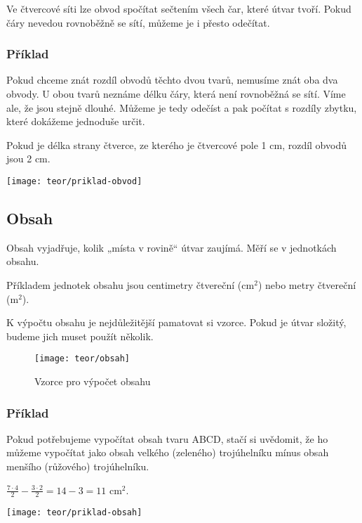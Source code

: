 Ve čtvercové síti lze obvod spočítat sečtením všech čar, které útvar tvoří. Pokud čáry nevedou rovnoběžně se sítí, můžeme je i přesto odečítat.

\subsubsection{Příklad}
\noindent
\begin{minipage}{\linewidth}
    Pokud chceme znát rozdíl obvodů těchto dvou tvarů, nemusíme znát oba dva obvody. U obou tvarů neznáme délku čáry, která není rovnoběžná se sítí. Víme ale, že jsou stejně dlouhé. Můžeme je tedy odečíst a pak počítat s rozdíly zbytku, které dokážeme jednoduše určit.

    Pokud je délka strany čtverce, ze kterého je čtvercové pole 1 cm, rozdíl obvodů jsou 2 cm.
    \begin{center}
        \texttt{[image: teor/priklad-obvod]}
    \end{center}
\end{minipage}

\subsection{Obsah}
Obsah vyjadřuje, kolik „místa v rovině“ útvar zaujímá. Měří se v jednotkách obsahu.~\cite{umim_mat}

Příkladem jednotek obsahu jsou centimetry čtvereční ($\text{cm}^{2}$) nebo metry čtvereční ($\text{m}^{2}$).


K výpočtu obsahu je nejdůležitější pamatovat si vzorce. Pokud je útvar složitý, budeme jich muset použít několik.

\begin{figure}[h]
    \centering
    \texttt{[image: teor/obsah]}
    \caption{Vzorce pro výpočet obsahu~\cite{umim_mat}}
\end{figure}

\subsubsection{Příklad}
\noindent
\begin{minipage}{\linewidth}
    Pokud potřebujeme vypočítat obsah tvaru ABCD, stačí si uvědomit, že ho můžeme vypočítat jako obsah velkého (zeleného) trojúhelníku mínus obsah menšího (růžového) trojúhelníku.

    $ \frac{7\cdot4}{2} - \frac{3\cdot2}{2} =  14 - 3 = 11 \text{ cm}^{2}$.
    \begin{center}
        \texttt{[image: teor/priklad-obsah]}
    \end{center}
\end{minipage}

